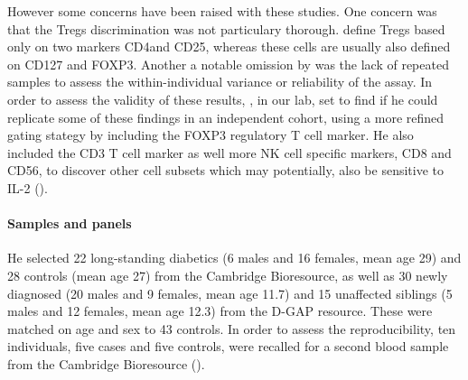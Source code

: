 However some concerns have been raised with these studies.
One concern was that the Tregs discrimination was not particulary thorough.
\citet{Long:2010ej} define Tregs based only on two markers CD4\positive and CD25\positive, whereas these cells are usually also defined on CD127 and FOXP3.
Another a notable omission by \citet{Long:2010ej} was the lack of repeated samples to assess the within-individual variance or reliability of the assay.
In order to assess the validity of these results, , in our lab, set to find if he could replicate some of these findings in an independent cohort, using a more refined gating stategy by including the FOXP3 regulatory T cell marker.
He also included the CD3 T cell marker as well more NK cell specific markers, CD8 and CD56,
to discover other cell subsets which may potentially, also be sensitive to IL-2 ().

\paragraph{Samples and panels}

He selected 22 long-standing diabetics (6 males and 16 females, mean age 29) and 28 controls (mean age 27) from the Cambridge Bioresource, as well as 30 newly diagnosed (20 males and 9 females, mean age 11.7) and 15 unaffected siblings (5 males and 12 females, mean age 12.3) from the \Gls{D-GAP} resource.  
These were matched on age and sex to 43 controls.
In order to assess the reproducibility, ten individuals, five cases and five controls, were recalled for a second blood sample from the Cambridge Bioresource ().

